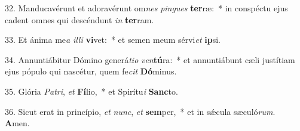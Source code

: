 32. Manducavérunt et adoravérunt om\textit{nes} \textit{pin}\textit{gues} \textbf{ter}ræ:~*  in conspéctu ejus cadent omnes qui descéndunt \textit{in} \textbf{ter}ram.\

33. Et ánima me\textit{a} \textit{il}\textit{li} \textbf{vi}vet:~*  et semen meum sérvi\textit{et} \textbf{ip}si.\

34. Annuntiábitur Dómino generá\textit{ti}\textit{o} \textit{ven}\textbf{tú}ra:~*  et annuntiábunt cæli justítiam ejus pópulo qui nascétur, quem fe\textit{cit} \textbf{Dó}minus.\

35. Glória \textit{Pa}\textit{tri}, \textit{et} \textbf{Fí}lio,~*  et Spirítu\textit{i} \textbf{Sanc}to.\

36. Sicut erat in princípio, \textit{et} \textit{nunc}, \textit{et} \textbf{sem}per,~*  et in sǽcula sæculó\textit{rum}. \textbf{A}men.\

